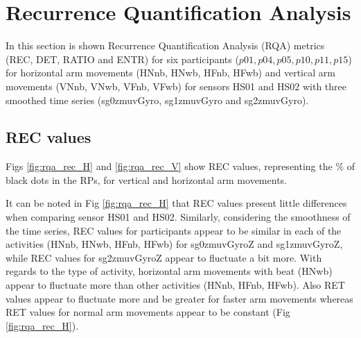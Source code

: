 \section{Recurrence Quantification Analysis}
In this section is shown Recurrence Quantification Analysis (RQA) metrics 
(REC, DET, RATIO and ENTR) for six participants ($p01, p04, p05, p10, p11, p15$)
for horizontal arm movements (HNnb, HNwb, HFnb, HFwb) 
and vertical arm movements (VNnb, VNwb, VFnb, VFwb)  
for sensors HS01 and HS02 with three smoothed time series 
(sg0zmuvGyro, sg1zmuvGyro and  sg2zmuvGyro).

\subsection{REC values}
Figs \ref{fig:rqa_rec_H} and \ref{fig:rqa_rec_V} show REC values,
representing the \% of black dots in the RPs, for vertical and horizontal 
arm movements.

It can be noted in Fig \ref{fig:rqa_rec_H} that REC values present 
little differences when comparing sensor HS01 and HS02. 
Similarly, considering the smoothness of the time series, REC values for 
participants appear to be similar in each of the activities 
(HNnb, HNwb, HFnb, HFwb) for sg0zmuvGyroZ and sg1zmuvGyroZ, 
while REC values for sg2zmuvGyroZ appear to fluctuate a bit more.
With regards to the type of activity, horizontal arm movements with beat 
(HNwb) appear to fluctuate more than other activities (HNnb, HFnb, HFwb). 
Also RET values appear to fluctuate more and be greater for faster
arm movements whereas RET values for normal arm movements appear 
to be constant (Fig \ref{fig:rqa_rec_H}).

